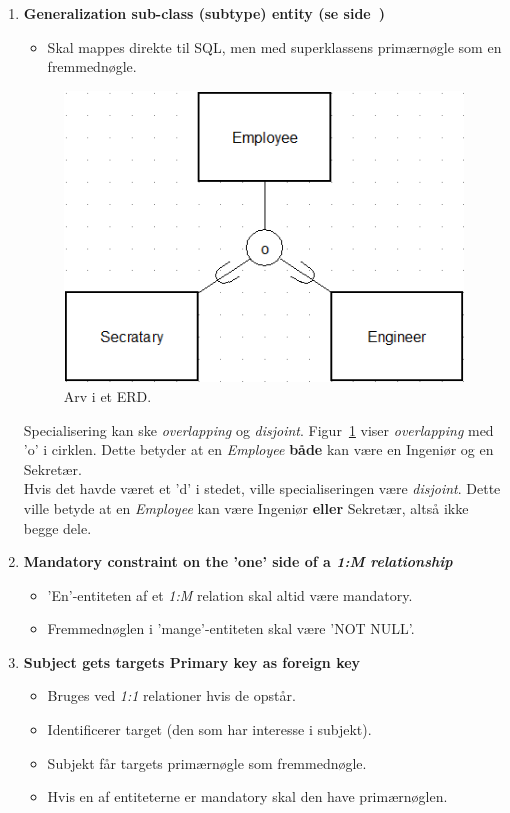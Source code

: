 \begin{enumerate}
	\item \textbf{Generalization sub-class (subtype) entity (se side~\pageref{sec:arv})}
	\begin{itemize}
		\item Skal mappes direkte til SQL, men med superklassens primærnøgle som en fremmednøgle.
	\end{itemize}
	
	\begin{figure}[H]
		\centering
		\includegraphics[width=0.5\linewidth]{figs/spm3/arv}
		\caption{Arv i et ERD. }
		\label{fig:arv1}
	\end{figure}
	
	Specialisering kan ske \textit{overlapping} og \textit{disjoint}. 
	Figur~\ref{fig:arv1} viser \textit{overlapping} med 'o' i cirklen. Dette betyder at en \textit{Employee} \textbf{både} kan være en Ingeniør og en Sekretær.\\
	
	Hvis det havde været et 'd' i stedet, ville specialiseringen være \textit{disjoint}. Dette ville betyde at en \textit{Employee} kan være Ingeniør \textbf{eller} Sekretær, altså ikke begge dele. 
	
	
	\item \textbf{Mandatory constraint on the 'one' side of a \textit{1:M relationship}}
	\begin{itemize}
		\item 'En'-entiteten af et \textit{1:M} relation skal altid være mandatory.
		\item Fremmednøglen i 'mange'-entiteten skal være 'NOT NULL'.
	\end{itemize}
		
	\item \textbf{Subject gets targets Primary key as foreign key}
	\begin{itemize}
		\item Bruges ved \textit{1:1} relationer hvis de opstår.
		\item Identificerer target (den som har interesse i subjekt).
		\item Subjekt får targets primærnøgle som fremmednøgle.
		\item Hvis en af entiteterne er mandatory skal den have primærnøglen.
	\end{itemize}
	
\end{enumerate}

